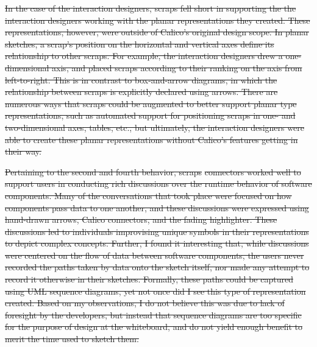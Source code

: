 \documentclass[12pt,fleqn]{ucithesis}
\providecommand{\DIFdeltex}[1]{{\protect\color{red}\sout{#1}}}                      %
\providecommand{\DIFdel}[1]{\texorpdfstring{\DIFdeltex{#1}}{}} %
\begin{document}
\DIFdel{In the case of the interaction designers, scraps fell short in supporting the the interaction designers working with the planar representations they created. These representations, however, were outside of Calico's original design scope. In planar sketches, a scrap's position on the horizontal and vertical axes define its relationship to other scraps. For example, the interaction designers drew a one-dimensional axis, and placed scraps according to their ranking on the axis from left-to-right. This is in contrast to box-and-arrow diagrams, in which the relationship between scraps is explicitly declared using arrows. There are numerous ways that scraps could be augmented to better support planar type representations, such as automated support for positioning scraps in one- and two-dimensional axes, tables, etc., but ultimately, the interaction designers were able to create these planar representations without Calico's features getting in their way. 
}%

\DIFdel{Pertaining to the second and fourth behavior, scraps }%
\DIFdel{connectors worked well to support users in conducting rich discussions over the runtime behavior of software components. Many of the conversations that took place were focused on how components pass data to one another, and these discussions were expressed using hand-drawn arrows, Calico connectors, and the fading highlighter. These discussions led to individuals improvising unique symbols in their representations to depict complex concepts. Further, I found it interesting that, while discussions were centered on the flow of data between software components, the users never recorded the paths taken by data onto the sketch itself, nor made any attempt to record it otherwise in their sketches. Formally, these paths could be captured using UML sequence diagrams, yet not once did I see this type of representation created. Based on my observations, I do not believe this was due to lack of foresight by the developers, but instead that sequence diagrams are too specific for the purpose of design at the whiteboard, and do not yield enough benefit to merit the time used to sketch them.
}%

\end{document}
